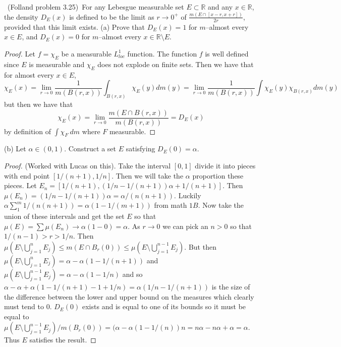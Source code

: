 \documentclass[11pt]{amsart}
\theoremstyle{definition}
\numberwithin{theorem}{section}
\numberwithin{definition}{section}
\numberwithin{equation}{section}
\def\reals{{\mathbb R}}
\begin{document}
\medskip {}\ (Folland problem 3.25)\ 
For any Lebesgue measurable set $E\subset\reals$
and any $x\in\reals$, the density $D_E(x)$
is defined to be the limit as $r\to 0^+$
of $\frac{m(E\cap [x-r,x+r])}{2r}$, provided that this limit exists.
\newline
(a) Prove that $D_E(x)=1$ for $m$--almost every $x\in E$, 
and $D_E(x)=0$ for $m$--almost every $x\in \reals\setminus E$.
\begin{proof}
	Let $f = \chi_E$ be a measurable $L^1_{loc}$ function. The function $f$ is well defined since $E$ is measurable and
	$\chi_E$ does not explode on finite sets. Then we have that for almost every $x \in E$,
	\begin{equation*}
		\chi_E(x) = \lim_{r\to 0}\frac{1}{m(B(r,x))} \int_{B(r,x)} \chi_E(y) dm(y) = \lim_{r\to 0}\frac{1}{m(B(r,x))} \int \chi_E(y) \chi_{B(r,x)} dm(y)
	\end{equation*}
	but then we have that
	\begin{equation*}
		\chi_E(x) = \lim_{r \to 0}\frac{m(E \cap B(r,x))}{m(B(r,x))} = D_E(x)
	\end{equation*}
	by definition of $\int \chi_F\ dm$ where $F$ measurable.
\end{proof}
(b) Let $\alpha\in(0,1)$.
Construct a set $E$ satisfying $D_E(0)=\alpha$.
\begin{proof}
(Worked with Lucas on this). Take the interval $[0,1]$ divide it into pieces with end point
 $[1/(n+1), 1/n]$. Then we will take the $\alpha$ proportion these pieces. Let $E_n = [1/(n+1), (1/n - 1/(n+1))\alpha +1/(n+1)].$
 Then $\mu(E_n) = (1/n - 1/(n+1))\alpha = \alpha/(n(n+1)).$ Luckily $\alpha \sum_1^m 1/(n(n+1)) = \alpha (1 - 1/(m+1))$ from math $1B$.
 Now take the union of these intervals and get the set $E$ so that $\mu(E) = \sum \mu(E_n) \to \alpha(1 - 0) = \alpha.$ As $r \to 0$
 we can pick an $ n > 0$ so that $1/(n-1) > r > 1/n$. Then $\mu(E \setminus \bigcup_{j=1}^nE_j) \leq m(E \cap B_r(0)) \leq \mu(E \setminus \bigcup_{j=1}^{n-1}E_j).$ But then $\mu(E \setminus \bigcup_{j=1}^nE_j) = \alpha - \alpha(1 - 1/(n+1))$ and $\mu(E \setminus \bigcup_{j=1}^{n-1}E_j) = \alpha - \alpha(1- 1/n)$ and so $\alpha - \alpha + \alpha(1 - 1/(n+1) - 1 + 1/n) = \alpha (1/n - 1/(n+1))$ is the size of the difference between the lower and upper bound on the measures  which clearly must tend to $0.$ $D_E(0)$ exists and is equal to one of its bounds
 so it must be equal to $\mu(E \setminus \bigcup_{j=1}^{n-1}E_j)/m(B_r(0)) =  (\alpha - \alpha(1 - 1/(n))n = n\alpha - n\alpha + \alpha = \alpha$. Thus $E$ satisfies the result.

\end{proof}
\end{document}
